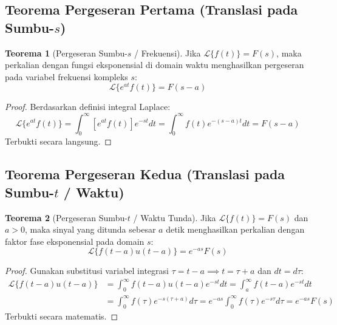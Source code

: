 \documentclass[11pt,a4paper]{article}
\theoremstyle{definition}
\newtheorem{theorem}{Teorema}[section]
\begin{document}
\subsection{Teorema Pergeseran Pertama (Translasi pada Sumbu-\texorpdfstring{$s$}{s})}

\begin{theorem}[Pergeseran Sumbu-$s$ / Frekuensi]
Jika $\mathcal{L}\{f(t)\} = F(s)$, maka perkalian dengan fungsi eksponensial di domain waktu menghasilkan pergeseran pada variabel frekuensi kompleks $s$:
\begin{equation}
    \mathcal{L}\{e^{at} f(t)\} = F(s - a)
    \label{eq:first_shift_theorem}
\end{equation}
\end{theorem}

\begin{proof}
Berdasarkan definisi integral Laplace:
\begin{equation*}
    \mathcal{L}\{e^{at} f(t)\} = \int_0^\infty \left[ e^{at} f(t) \right] e^{-st} dt = \int_0^\infty f(t) e^{-(s - a)t} dt = F(s - a)
\end{equation*}
Terbukti secara langsung.
\end{proof}

\subsection{Teorema Pergeseran Kedua (Translasi pada Sumbu-\texorpdfstring{$t$}{t} / Waktu)}

\begin{theorem}[Pergeseran Sumbu-$t$ / Waktu Tunda]
Jika $\mathcal{L}\{f(t)\} = F(s)$ dan $a > 0$, maka sinyal yang ditunda sebesar $a$ detik menghasilkan perkalian dengan faktor fase eksponensial pada domain $s$:
\begin{equation}
    \mathcal{L}\{f(t - a) u(t - a)\} = e^{-as} F(s)
    \label{eq:second_shift_theorem}
\end{equation}
\end{theorem}

\begin{proof}
Gunakan substitusi variabel integrasi $\tau = t - a \implies t = \tau + a$ dan $dt = d\tau$:
\begin{align*}
    \mathcal{L}\{f(t - a) u(t - a)\} &= \int_0^\infty f(t - a) u(t - a) e^{-st} dt = \int_a^\infty f(t - a) e^{-st} dt \\
    &= \int_0^\infty f(\tau) e^{-s(\tau + a)} d\tau = e^{-as} \int_0^\infty f(\tau) e^{-s\tau} d\tau = e^{-as} F(s)
\end{align*}
Terbukti secara matematis.
\end{proof}
\end{document}
